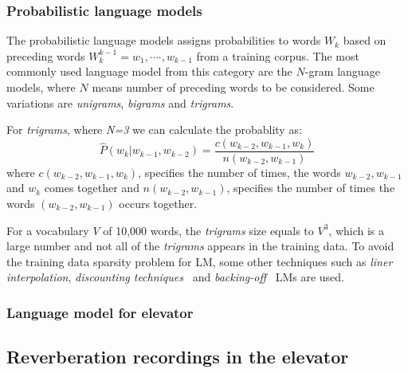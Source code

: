 \documentclass[a4paper, 12pt]{article}
\begin{document}
\subsubsection{Probabilistic language models}
\label{sec:prob_lang_model}
The probabilistic language models assigns probabilities to words $\textit{W}_k$ based on preceding words $\textit{W}_k^{k-1} = \textit{w}_1 , \cdots \cdot,\textit{w}_{k-1}$  from a training corpus. The most commonly used language model from this category are the $N$-gram language models, where $N$ means number of preceding words to be considered. Some variations are \textit{unigrams}, \textit{bigrams} and \textit{trigrams}. 

For \textit{trigrams}, where \textit{N=3} we can calculate the probablity as:
\begin{equation}
  \hat{P}(w_k | w_{k-1},w_{k-2}) = \frac{c(w_{k-2},w_{k-1},w_k)}{n(w_{k-2},w_{k-1})} 
\end{equation}
where $c(w_{k-2},w_{k-1},w_k)$, specifies the number of times, the words $w_{k-2},w_{k-1}$ and $w_k$ comes together and $n(w_{k-2},w_{k-1})$, specifies the number of times the words $(w_{k-2},w_{k-1})$ occurs together. 

For a vocabulary $V$ of 10,000 words, the \textit{trigrams} size equals to $V^3$, which is a large number and not all of the \textit{trigrams} appears in the training data. To avoid the training data sparsity problem for LM, some other techniques such as \textit{liner interpolation}, \textit{discounting techniques}~\cite{good1953population} and \textit{backing-off}~\cite{s_m_katze, ney94} LMs are used.

\subsubsection{Language model for elevator}


\subsection{Reverberation recordings in the elevator}
\end{document}
